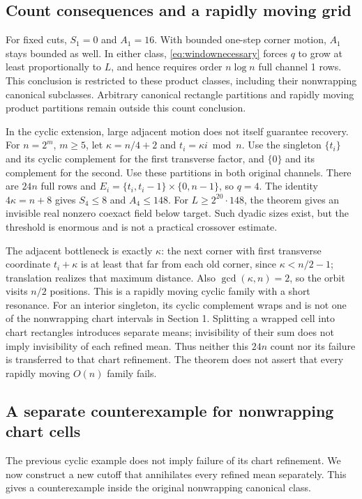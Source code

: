 \subsection{Count consequences and a rapidly moving grid}
For fixed cuts, $S_1=0$ and $A_1=16$. With bounded one-step corner
motion, $A_1$ stays bounded as well. In either class,
\eqref{eq:windownecessary} forces $q$ to grow at least proportionally to
$L$, and hence requires order $n\log n$ full channel 1 rows. This conclusion
is restricted to these product classes, including their nonwrapping
canonical subclasses. Arbitrary canonical rectangle partitions and
rapidly moving product partitions remain outside this count conclusion.

In the cyclic extension, large adjacent motion does not itself guarantee
recovery. For
$n=2^m$, $m\geq5$, let $\kappa=n/4+2$ and $t_i=\kappa i\bmod n$.
Use the singleton $\{t_i\}$ and its cyclic complement for the first
transverse factor, and $\{0\}$ and its complement for the second.
Use these partitions in both original channels. There are $24n$ full rows
and $E_i=\{t_i,t_i-1\}\times\{0,n-1\}$, so $q=4$.
The identity $4\kappa=n+8$ gives $S_4\leq8$ and $A_4\leq148$.
For $L\geq2^{20}\cdot148$, the theorem gives an invisible real nonzero
coexact field below target. Such dyadic sizes exist, but the threshold is
enormous and is not a practical crossover estimate.

The adjacent bottleneck is exactly $\kappa$: the next corner with first
transverse coordinate $t_i+\kappa$ is at least that far from each old
corner, since $\kappa<n/2-1$; translation realizes that maximum distance.
Also $\gcd(\kappa,n)=2$, so the orbit visits $n/2$ positions.
This is a rapidly moving cyclic family with a short resonance. For an
interior singleton, its cyclic complement wraps and is not one of the
nonwrapping chart intervals in Section 1. Splitting a wrapped cell into
chart rectangles introduces separate means; invisibility of their sum
does not imply invisibility of each refined mean. Thus neither this
$24n$ count nor its failure is transferred to that chart refinement.
The theorem does not assert that every rapidly moving $O(n)$ family fails.


\subsection{A separate counterexample for nonwrapping chart cells}
The previous cyclic example does not imply failure of its chart refinement.
We now construct a new cutoff that annihilates every refined mean separately.
This gives a counterexample inside the original nonwrapping canonical class.

